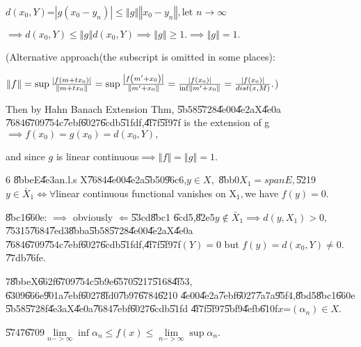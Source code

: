 \documentclass{article}
\begin{document}
$d\left( x_{0},Y\right) $=$\left\vert g\left( x_{0}-y_{n}\right) \right\vert
\leq \left\Vert g\right\Vert \left\Vert x_{0}-y_{n}\right\Vert ,$let $%
n\rightarrow \infty $

$\implies d\left( x_{0},Y\right) \leq \left\Vert g\right\Vert d\left(
x_{0},Y\right) \implies \left\Vert g\right\Vert \geq 1.\implies \left\Vert
g\right\Vert =1.$

\bigskip (Alternative approach(the subscript is omitted in some places):

$\left\Vert f\right\Vert =\sup \frac{\left\vert f\left( m+tx_{0}\right)
\right\vert }{\left\Vert m+tx_{0}\right\Vert }=\sup \frac{\left\vert f\left(
m^{\prime }+x_{0}\right) \right\vert }{\left\Vert m^{\prime
}+x_{0}\right\Vert }=\frac{\left\vert f\left( x_{0}\right) \right\vert }{%
\inf \left\Vert m^{\prime }+x_{0}\right\Vert }=\frac{\left\vert f\left(
x_{0}\right) \right\vert }{dist\left( x,M\right) }.$)

Then by Hahn Banach Extension Thm, \U{5b58}\U{5728}\U{4e00}\U{4e2a}X\U{4e0a}%
\U{7684}\U{6709}\U{754c}\U{7ebf}\U{6027}\U{6cdb}\U{51fd}f,\U{4f7f}\U{5f97}f
is the extension of g$\implies f\left( x_{0}\right) =g\left( x_{0}\right)
=d\left( x_{0},Y\right) ,$

and since $g$ is linear continuous$\implies \left\Vert f\right\Vert
=\left\Vert g\right\Vert =1.$

6 \U{8bbe}E\U{4e3a}n.l.s X\U{7684}\U{4e00}\U{4e2a}\U{5b50}\U{96c6},$y\in X,$%
\U{8bb0}$X_{1}=spanE,$\U{5219}$y\in \bar{X}_{1}\iff \forall $linear
continuous functional vanishes on X$_{1},$we have $f\left( y\right) =0.$

\U{8bc1}\U{660e}: $\implies $ obviously $\Longleftarrow $\U{53cd}\U{8bc1}%
\U{6cd5},\U{82e5}$y\notin \bar{X}_{1}\implies d\left( y,X_{1}\right) >0,$%
\U{7531}5\U{7684}\U{7ed3}\U{8bba}\U{5b58}\U{5728}\U{4e00}\U{4e2a}X\U{4e0a}%
\U{7684}\U{6709}\U{754c}\U{7ebf}\U{6027}\U{6cdb}\U{51fd}f,\U{4f7f}\U{5f97}f$%
\left( Y\right) =0$ but $f\left( y\right) =d\left( x_{0},Y\right) \neq 0.$%
\U{77db}\U{76fe}.

7\U{8bbe}X\U{662f}\U{6709}\U{754c}\U{5b9e}\U{6570}\U{5217}\U{5168}\U{4f53},%
\U{6309}\U{666e}\U{901a}\U{7ebf}\U{6027}\U{8fd0}\U{7b97}\U{6784}\U{6210}%
\U{4e00}\U{4e2a}\U{7ebf}\U{6027}\U{7a7a}\U{95f4},\U{8bd5}\U{8bc1}\U{660e}%
\U{5b58}\U{5728}f\U{4e3a}X\U{4e0a}\U{7684}\U{7ebf}\U{6027}\U{6cdb}\U{51fd}%
\U{4f7f}\U{5f97}\U{5bf9}\U{4efb}\U{610f}$x$=$\left( \alpha _{n}\right) \in
X. $

\U{5747}\U{6709}$\underset{n->\infty }{\lim }\inf \alpha _{n}\leq f\left(
x\right) \leq \underset{n->\infty }{\lim }\sup \alpha _{n}.$
\end{document}

